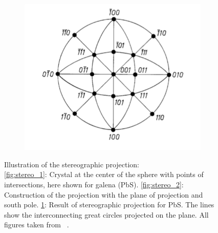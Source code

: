 \begin{figure}[h]
\begin{subfigure}[b]{\picwidth}
    \includegraphics[width=\textwidth]{figures/stereo_3}
    \caption{}
    \label{fig:stereo_3}
    \end{subfigure}
    \caption{
        Illustration of the stereographic projection:\\
        \ref{fig:stereo_1}:
            Crystal at the center of the sphere with points of intersections, 
            here shown for galena (PbS).
        \ref{fig:stereo_2}:
            Construction of the projection with the 
            plane of projection and south pole.
        \ref{fig:stereo_3}:
            Result of stereographic projection for PbS. The lines 
            show the interconnecting great circles projected on the plane. 
            All figures taken from ~\cite{borchardt1995crystallography}.}
    \label{fig:stereo}
\end{figure}


